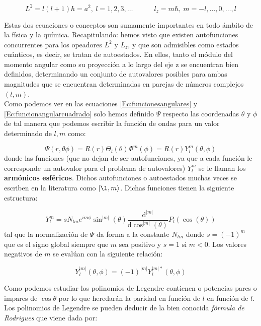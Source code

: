 \documentclass[12pt]{article}
\newcommand{\D}{\mathrm{d}}
\newcommand{\derivadas}[2]{\frac{\D #1}{\D #2}}
\newcommand{\tquad}{\quad \quad \quad}
\begin{document}
\begin{equation}
L^2 = l(l+1) \hbar = a^2, \ l = 1,2,3,\ldots \tquad l_z = m\hbar, \ m = -l,\ldots,0,\ldots,l
\end{equation}

Estas dos ecuaciones o conceptos son sumamente importantes en todo ámbito de la física y la química. Recapitulando: hemos visto que existen autofunciones concurrentes para los opeadores $L^2$ y $L_z$, y que son admisibles como estados cuánticos, es decir, se tratan de autoestados. En ellos, tanto el módulo del momento angular como su proyección a lo largo del eje z se encuentran bien definidos, determinando un conjunto de autovalores posibles para ambas magnitudes que se encuentran determinadas en parejas de números complejos $(l,m)$. \\

Como podemos ver en las ecuaciones \ref{Ec:funcionesangulares} y \ref{Ec:funcionangularcuadrado} solo hemos definido $\Psi$ respecto las coordenadas $\theta$ y $\phi$ de tal manera que podemos escribir la función de ondas para un valor determinado de $l,m$ como:

\begin{equation}
\Psi (r,\theta\phi)=R(r)\Theta_l(\theta)\Phi^m(\phi) = R(r) Y_l^m (\theta, \phi)
\end{equation}
donde las funciones (que no dejan de ser autofunciones, ya que a cada función le corresponde un autovalor para el problema de autovalores) $Y_l^m$ se le llaman los \textbf{armónicos esféricos}. Dichos autofunciones o autoestados muchas veces se escriben en la literatura como $| \l, m \rangle$. Dichas funciones tienen la siguiente estructura:

\begin{equation}
Y_l^m = s N_{lm} e^{im \phi} \sin^{|m|} (\theta) \derivadas{^{|m|}}{\cos^{|m|} (\theta)} P_ l (\cos (\theta))
\end{equation}
tal que la normalización de $\Psi$ da forma a la constante $N_{lm}$ donde $s=(-1)^m$ que es el signo global siempre que $m$ sea positivo y $s=1$ si $m<0$. Los valores negativos de $m$ se evalúan con la siguiente relación:

\begin{equation}
Y_l^{|m|} (\theta,\phi)= (-1)^{|m|} Y_l^{|m|*} (\theta, \phi)
\end{equation}

Como podemos estudiar los polinomios de Legendre contienen o potencias pares o impares de $\cos \theta$ por lo que heredarán la paridad en función de $l$ en función de $l$. Los polinomios de Legendre se pueden deducir de la bien conocida \textit{fórmula de Rodrigues} que viene dada por:
\end{document}
